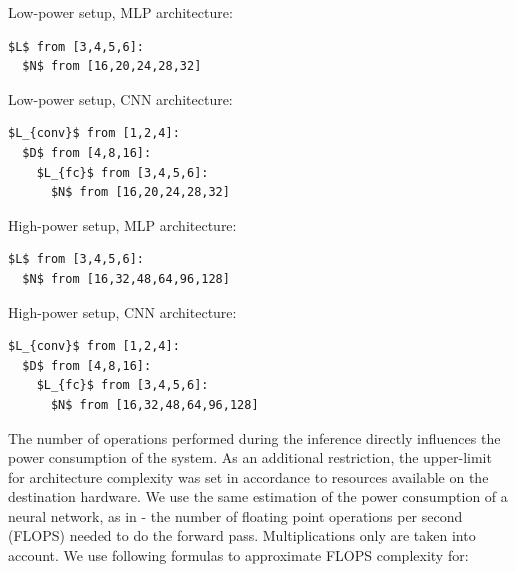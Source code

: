 \begin{itemize}

    \begin{minipage}{0.90\columnwidth}
    \item Low-power setup, MLP architecture:
    \begin{lstlisting}[mathescape]
$L$ from [3,4,5,6]:
  $N$ from [16,20,24,28,32]
    \end{lstlisting}
    \end{minipage}
    
    \begin{minipage}{0.90\columnwidth}
    \item Low-power setup, CNN architecture:
    \begin{lstlisting}[mathescape]
$L_{conv}$ from [1,2,4]:
  $D$ from [4,8,16]:
    $L_{fc}$ from [3,4,5,6]:
      $N$ from [16,20,24,28,32]
    \end{lstlisting}
    \end{minipage}
    
    \begin{minipage}{0.90\columnwidth}
    \item High-power setup, MLP architecture:
    \begin{lstlisting}[mathescape]
$L$ from [3,4,5,6]:
  $N$ from [16,32,48,64,96,128]
    \end{lstlisting}
    \end{minipage}
    
    \begin{minipage}{0.90\columnwidth}
    \item High-power setup, CNN architecture:
    \begin{lstlisting}[mathescape]
$L_{conv}$ from [1,2,4]:
  $D$ from [4,8,16]:
    $L_{fc}$ from [3,4,5,6]:
      $N$ from [16,32,48,64,96,128]
    \end{lstlisting}
    \end{minipage}

\end{itemize}

The number of operations performed during the inference directly influences the power consumption of the system. As an additional restriction, the upper-limit for architecture complexity was set in accordance to resources available on the destination hardware. We use the same estimation of the power consumption of a neural network, as in \cite{zemblys2018making} - the number of floating point operations per second (FLOPS) needed to do the forward pass. Multiplications only are taken into account. We use following formulas to approximate FLOPS complexity for:

